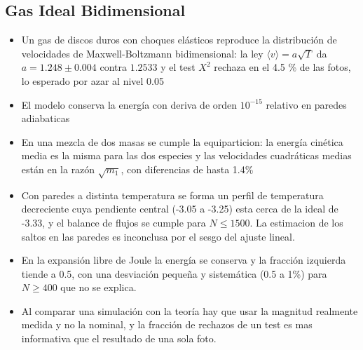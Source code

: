 \documentclass{article}
\begin{document}
\subsection{Gas Ideal Bidimensional}
\begin{itemize}
    \item Un gas de discos duros con choques elásticos reproduce la distribución de velocidades de Maxwell-Boltzmann bidimensional: la ley $\langle v\rangle=a\sqrt{T}$ da $a=1.248\pm 0.004$ contra $1.2533$ y el test $X^2$ rechaza en el 4.5 \% de las fotos, lo esperado por azar al nivel 0.05
    \item El modelo conserva la energía con deriva de orden $10^{-15}$ relativo en paredes adiabaticas
    \item En una mezcla de dos masas se cumple la equiparticion: la energía cinética media es la misma para las dos especies y las velocidades cuadráticas medias están en la razón $\sqrt{m_1}$, con diferencias de hasta 1.4\%
    \item Con paredes a distinta temperatura se forma un perfil de temperatura decreciente cuya pendiente central (-3.05 a -3.25) esta cerca de la ideal de -3.33, y el balance de flujos se cumple para $N\leq 1500$. La estimacion de los saltos en las paredes es inconclusa por el sesgo del ajuste lineal.
    \item En la expansión libre de Joule la energía se conserva y la fracción izquierda tiende a 0.5, con una desviación pequeña y sistemática (0.5 a 1\%) para $N\geq400$ que no se explica.
    \item Al comparar una simulación con la teoría hay que usar la magnitud realmente medida y no la nominal, y la fracción de rechazos de un test es mas informativa que el resultado de una sola foto.
\end{itemize}
\end{document}
